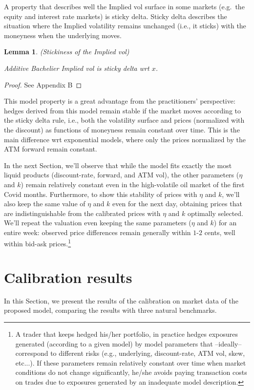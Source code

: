 \documentclass[12pt]{article}
\newtheorem{lemma}[theorem]{Lemma}
\theoremstyle{definition}
\theoremstyle{remark}
\numberwithin{theorem}{section}
\numberwithin{proposition}{section}
\numberwithin{lemma}{section}
\numberwithin{corollary}{section}
\numberwithin{definition}{section}
\numberwithin{remark}{section}
\numberwithin{example}{section}
\begin{document}
A property that describes well the Implied vol surface in some markets (e.g.\ the equity and interest rate markets) is sticky delta.
Sticky delta describes the situation where the Implied volatility remains unchanged (i.e., it sticks) with the moneyness when the underlying moves.

\begin{lemma} {\rm (Stickiness of the Implied vol)}
\label{lem:sticky}

Additive Bachelier Implied vol is sticky delta wrt $x$.
\end{lemma}
\begin{proof}
See Appendix B
\end{proof}

This model property is a great advantage from the practitioners' perspective: 
hedges derived from this model remain stable if the market moves according to the sticky delta rule, i.e., both the volatility surface and prices (normalized with the discount) as functions of moneyness remain constant over time. This is the main difference wrt exponential models, where only the prices normalized by the ATM forward remain constant.

In the next Section, we'll observe that while the model fits exactly the most liquid products (discount-rate, forward, and ATM vol), 
the other parameters ($\eta$ and $k$) remain relatively constant even in the high-volatile oil market of the first 
Covid months. Furthermore, to show this stability of prices with $\eta$ and $k$, we'll also keep the same value of $\eta$ and $k$ even for the next day, obtaining prices that are indistinguishable from the calibrated prices with $\eta$ and $k$ optimally selected. We'll repeat the valuation even keeping the same parameters ($\eta$ and $k$) for an entire week: observed price differences remain generally within $1$-$2$ cents, well within bid-ask prices.\footnote{A trader that keeps hedged his/her portfolio, in practice hedges exposures generated (according to a given model) 
by model parameters that 
--ideally-- correspond to different risks (e.g., underlying, discount-rate, ATM vol, skew, etc...).
If these parameters remain relatively constant over time when market conditions do not change significantly,
he/she avoids paying transaction costs on trades due to exposures generated by an inadequate model description.}

\section{Calibration results}\label{sec:Results}
In this Section, we present the results of the calibration on market data of the proposed model, comparing the results with 
three natural benchmarks.
\end{document}
